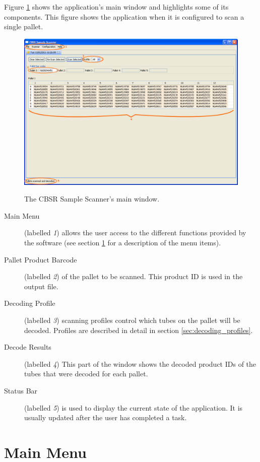 Figure \ref{fig:main_window} shows the application's main window and highlights
some of its components. This figure shows the application when it is configured
to scan a single pallet.
\begin{figure}[H]
  \centering
  \scalebox{0.35}
	   { \includegraphics*{screenshots/overview/main_window} }
	   \caption{The CBSR Sample Scanner's main window.}
	   \label{fig:main_window}
\end{figure}
\begin{description}
\item[Main Menu] (labelled \emph{1}) allows the user access to the
  different functions provided by the software (see section \ref{sec:main_menu}
  for a description of the menu items).
\item [Pallet Product Barcode] (labelled \emph{2}) of the pallet to be
  scanned. This product ID is used in the output file.
\item [Decoding Profile] (labelled \emph{3}) scanning profiles control which
  tubes on the pallet will be decoded. Profiles are described in detail in
  section \ref{sec:decoding_profiles}.
\item [Decode Results] (labelled \emph{4}) This part of the window shows the
  decoded product IDs of the tubes that were decoded for each pallet.
\item [Status Bar] (labelled \emph{5}) is used to display the current state of the
  application. It is usually updated after the user has completed a task.
\end{description}

\section{Main Menu}
\label{sec:main_menu}
